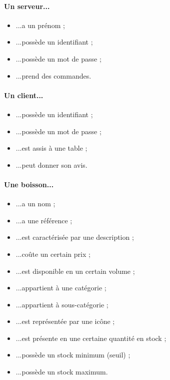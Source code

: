 

\begin{minipage}[l]{0.5\textwidth}
	\paragraph{Un serveur...}
	\begin{itemize}
		\item ...a un prénom ;
		\item ...possède un identifiant ;
		\item ...possède un mot de passe ;
		\item ...prend des commandes.
	\end{itemize}

	\paragraph{Un client...}
	\begin{itemize}
		\item ...possède un identifiant ;
		\item ...possède un mot de passe ;
		\item ...est assis à une table ;
		\item ...peut donner son avis.
	\end{itemize}

	\paragraph{Une boisson...}
	\begin{itemize}		
		\item ...a un nom ;
		\item ...a une référence ;
		\item ...est caractérisée par une description ;
		\item ...coûte un certain prix ;
		\item ...est disponible en un certain volume ;
		\item ...appartient à une catégorie ;
		\item ...appartient à sous-catégorie ;
		\item ...est représentée par une icône ;
		\item ...est présente en une certaine quantité en stock ;
		\item ...possède un stock minimum (seuil) ;
		\item ...possède un stock maximum.
	\end{itemize}
\end{minipage}
